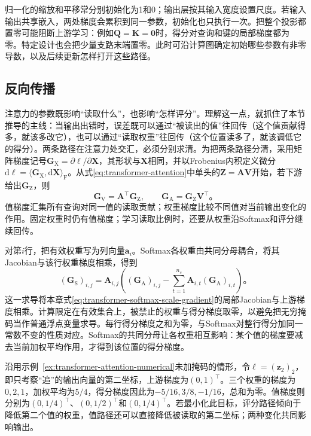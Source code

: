 归一化的缩放和平移常分别初始化为1和0；输出层按其输入宽度设置尺度。若输入输出共享嵌入，两处梯度会累积到同一参数，初始化也只执行一次。把整个投影都置零可能阻断上游学习：例如$\bm Q=\bm K=\bm0$时，得分对查询和键的局部梯度都为零。特定设计也会把少量支路末端置零。此时可沿计算图确定初始哪些参数有非零导数，以及后续更新怎样打开这些路径。

\subsection{反向传播}
\label{sec:transformer-backpropagation}

注意力的参数既影响“读取什么”，也影响“怎样评分”。理解这一点，就抓住了本节推导的主线：当输出出错时，误差既可以通过“被读出的值”往回传（这个值贡献得多，就该多改它），也可以通过“读取权重”往回传（这个位置读多了，就该调低它的得分）。两条路径在注意力处交汇，必须分别求清。为把两条路径分清，采用矩阵梯度记号$\bm G_{\mathrm X}=\partial\ell/\partial\bm X$，其形状与$\bm X$相同，并以Frobenius内积定义微分$\mathrm d\ell=\langle\bm G_{\mathrm X},\mathrm d\bm X\rangle_{\mathrm F}$。从式\eqref{eq:transformer-attention}中单头的$\bm Z=\bm A\bm V$开始，若下游给出$\bm G_{\mathrm Z}$，则
\begin{equation}
  \bm G_{\mathrm V}=\bm A^{\top}\bm G_{\mathrm Z},\qquad
  \bm G_{\mathrm A}=\bm G_{\mathrm Z}\bm V^{\top}\text{。}
  \label{eq:transformer-aggregation-gradient}
\end{equation}
值梯度汇集所有查询对同一值的读取贡献；权重梯度比较不同值对当前输出变化的作用。固定权重时仍有值梯度；学习读取比例时，还要从权重沿Softmax和评分继续回传。

对第$i$行，把有效权重写为列向量$\bm a_i$。Softmax各权重由共同分母耦合，将其Jacobian与该行权重梯度相乘，得到
\begin{equation}
  (\bm G_{\mathrm S})_{i,j}
   =\bm A_{i,j}\left((\bm G_{\mathrm A})_{i,j}
       -\sum_{t=1}^{n_s}\bm A_{i,t}(\bm G_{\mathrm A})_{i,t}\right)\text{。}
  \label{eq:transformer-softmax-gradient}
\end{equation}
这一求导将本章式\eqref{eq:transformer-softmax-scale-gradient}的局部Jacobian与上游梯度相乘。计算限定在有效集合上，被禁止的权重与得分梯度取零，以避免把无穷掩码当作普通浮点变量求导。每行得分梯度之和为零，与Softmax对整行得分加同一常数不变的性质对应。Softmax的共同分母让各权重相互影响：某个值的梯度要减去当前加权平均作用，才得到该位置的得分梯度。

\Needspace{45mm}
\begin{example}[从聚合误差到评分误差]
  \label{ex:transformer-gradient-numerical}
  沿用示例~\ref{ex:transformer-attention-numerical}未加掩码的情形，令$\ell=(\bm z_2)_2$，即只考察“追”的输出向量的第二坐标，上游梯度为$(0,1)^{\top}$。三个权重的梯度为$0,2,1$，加权平均为$5/4$，得分梯度因此为$-5/16,3/8,-1/16$，总和为零。值梯度则分别为$(0,1/4)^{\top}$、$(0,1/2)^{\top}$和$(0,1/4)^{\top}$。若最小化此目标，评分路径倾向于降低第二个值的权重，值路径还可以直接降低被读取的第二坐标；两种变化共同影响输出。
\end{example}

